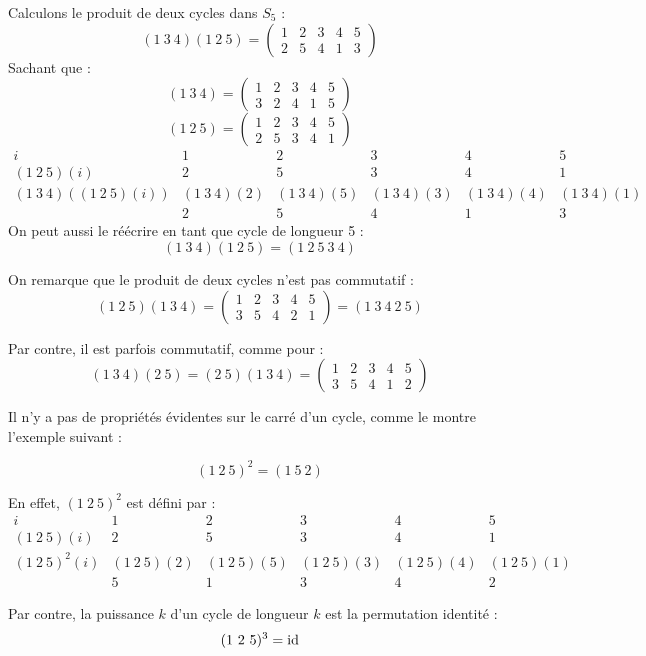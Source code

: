 \documentclass[12pt, a4paper]{report}
\begin{document}
\begin{example}
    Calculons le produit de deux cycles dans $S_5$ :
    $$(1 \ 3 \ 4)(1 \ 2 \ 5) = \left(\begin{matrix} 1 & 2 & 3 & 4 & 5 \\ 2 & 5 & 4 & 1 & 3 \end{matrix}\right)$$
    Sachant que :
    $$
    (1 \ 3 \ 4) = \left(\begin{matrix} 1 & 2 & 3 & 4 & 5 \\ 3 & 2 & 4 & 1 & 5 \end{matrix}\right)
    $$
    $$
    (1 \ 2 \ 5) = \left(\begin{matrix} 1 & 2 & 3 & 4 & 5 \\ 2 & 5 & 3 & 4 & 1 \end{matrix}\right)
    $$
    \[\begin{array}{c|ccccc}
    i & 1 & 2 & 3 & 4 & 5 \\
    (1 \ 2 \ 5)(i) & 2 & 5 & 3 & 4 & 1 \\
    (1 \ 3 \ 4)((1 \ 2 \ 5)(i)) & (1 \ 3 \ 4)(2) & (1 \ 3 \ 4)(5) & (1 \ 3 \ 4)(3) & (1 \ 3 \ 4)(4) & (1 \ 3 \ 4)(1) \\
    & 2 & 5 & 4 & 1 & 3
    \end{array}\]
    On peut aussi le réécrire en tant que cycle de longueur 5 :
    $$(1 \ 3 \ 4)(1 \ 2 \ 5) = (1 \ 2 \ 5 \ 3 \ 4)$$

    On remarque que le produit de deux cycles n'est pas commutatif :
    $$(1 \ 2 \ 5)(1 \ 3 \ 4) = \left(\begin{matrix} 1 & 2 & 3 & 4 & 5 \\ 3 & 5 & 4 & 2 & 1 \end{matrix}\right) = (1 \ 3 \ 4 \ 2 \ 5)$$

    Par contre, il est parfois commutatif, comme pour :
    $$(1 \ 3 \ 4)(2 \ 5) = (2 \ 5)(1 \ 3 \ 4) = \left(\begin{matrix} 1 & 2 & 3 & 4 & 5 \\ 3 & 5 & 4 & 1 & 2 \end{matrix}\right)$$

    Il n'y a pas de propriétés évidentes sur le carré d'un cycle, comme le montre l'exemple suivant :

    $$(1 \ 2 \ 5)^2 = (1 \ 5 \ 2)$$

    En effet, $(1 \ 2 \ 5)^2$ est défini par :
    \[\begin{array}{c|ccccc}
    i & 1 & 2 & 3 & 4 & 5 \\
    (1 \ 2 \ 5)(i) & 2 & 5 & 3 & 4 & 1 \\
    (1 \ 2 \ 5)^2(i) & (1 \ 2 \ 5)(2) & (1 \ 2 \ 5)(5) & (1 \ 2 \ 5)(3) & (1 \ 2 \ 5)(4) & (1 \ 2 \ 5)(1) \\
    & 5 & 1 & 3 & 4 & 2
    \end{array}\]

    Par contre, la puissance $k$ d'un cycle de longueur $k$ est la permutation identité :
    $$(1 \ 2 \ 5)^3 = \mathrm{id}$$
\end{example}
\end{document}
